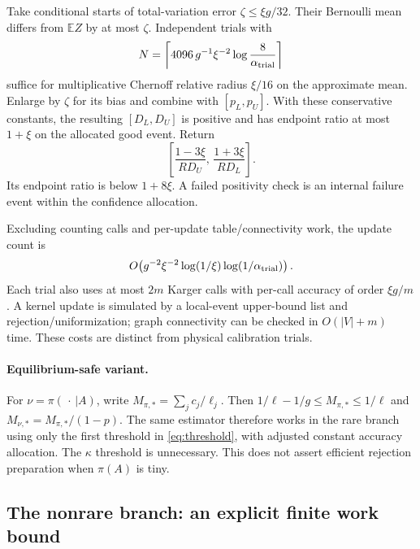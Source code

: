 \documentclass[10pt,a4paper]{article}
\theoremstyle{definition}\newtheorem{assumption}[theorem]{Assumption}
\newcommand{\E}{\mathbb E}
\begin{document}
Take conditional starts of total-variation error $\zeta\le\xi g/32$. Their Bernoulli mean differs from $\E Z$ by at most $\zeta$. Independent trials with
\begin{equation}
 N=\left\lceil4096\,g^{-1}\xi^{-2}
                  \log\frac8{\alpha_{\rm trial}}\right\rceil
 \label{eq:Nshort}
\end{equation}
suffice for multiplicative Chernoff relative radius $\xi/16$ on the approximate mean. Enlarge by $\zeta$ for its bias and combine with $[p_L,p_U]$. With these conservative constants, the resulting $[D_L,D_U]$ is positive and has endpoint ratio at most $1+\xi$ on the allocated good event. Return
\begin{equation}
 \left[\frac{1-3\xi}{R D_U},\,
       \frac{1+3\xi}{R D_L}\right].
 \label{eq:rareinterval}
\end{equation}
Its endpoint ratio is below $1+8\xi$. A failed positivity check is an internal failure event within the confidence allocation.

Excluding counting calls and per-update table/connectivity work, the update count is
\[
 O\!\left(g^{-2}\xi^{-2}\log(1/\xi)
                         \log(1/\alpha_{\rm trial})\right).
\]
Each trial also uses at most $2m$ Karger calls with per-call accuracy of order $\xi g/m$. A kernel update is simulated by a local-event upper-bound list and rejection/uniformization; graph connectivity can be checked in $O(|V|+m)$ time. These costs are distinct from physical calibration trials.

\paragraph{Equilibrium-safe variant.}
For $\nu=\pi(\,\cdot\,|A)$, write $M_{\pi,*}=\sum_jc_j/\ell_j$. Then
$1/\ell-1/g\le M_{\pi,*}\le1/\ell$ and
$M_{\nu,*}=M_{\pi,*}/(1-p)$.
The same estimator therefore works in the rare branch using only the first threshold in \eqref{eq:threshold}, with adjusted constant accuracy allocation. The $\kappa$ threshold is unnecessary. This does not assert efficient rejection preparation when $\pi(A)$ is tiny.

\subsection{The nonrare branch: an explicit finite work bound}
\end{document}
